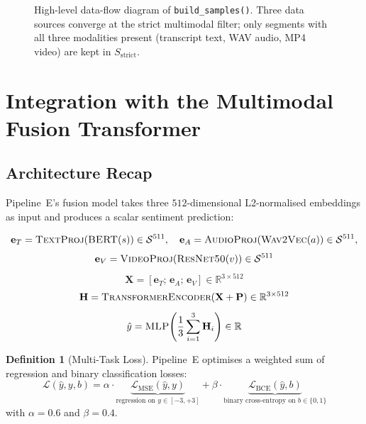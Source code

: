 \documentclass[12pt,a4paper]{article}
\theoremstyle{plain}
\theoremstyle{definition}
\newtheorem{definition}[theorem]{Definition}
\begin{document}
\begin{figure}[H]
\caption{%
  High-level data-flow diagram of \texttt{build\_samples()}.
  Three data sources converge at the strict multimodal filter; only
  segments with all three modalities present (transcript text, WAV
  audio, MP4 video) are kept in $S_\text{strict}$.
}
\label{fig:dataflow}
\end{figure}

\section{Integration with the Multimodal Fusion Transformer}
\label{sec:integration}

\subsection{Architecture Recap}

Pipeline~E's fusion model takes three $512$-dimensional L2-normalised
embeddings as input and produces a scalar sentiment prediction:

\[
  \mathbf{e}_T = \textsc{TextProj}(\textsc{BERT}(s))
  \in \mathcal{S}^{511}, \quad
  \mathbf{e}_A = \textsc{AudioProj}(\textsc{Wav2Vec}(a))
  \in \mathcal{S}^{511},
\]
\[
  \mathbf{e}_V = \textsc{VideoProj}(\textsc{ResNet50}(v))
  \in \mathcal{S}^{511}
\]
\[
  \mathbf{X} = [\mathbf{e}_T;\, \mathbf{e}_A;\, \mathbf{e}_V]
  \in \mathbb{R}^{3 \times 512}
\]
\[
  \mathbf{H} = \textsc{TransformerEncoder}(\mathbf{X} + \mathbf{P})
  \in \mathbb{R}^{3 \times 512}
\]
\[
  \hat{y} = \textsc{MLP}\!\left(\frac{1}{3}\sum_{i=1}^3
  \mathbf{H}_i\right) \in \mathbb{R}
\]

\begin{definition}[Multi-Task Loss]
\label{def:loss}
  Pipeline~E optimises a weighted sum of regression and binary
  classification losses:
  \[
    \mathcal{L}(\hat{y}, y, b) =
    \alpha \cdot \underbrace{\mathcal{L}_\text{MSE}(\hat{y}, y)}_{\text{regression on }y\in[-3,+3]}
    + \beta \cdot
    \underbrace{\mathcal{L}_\text{BCE}(\hat{y}, b)}_{\text{binary cross-entropy on }b\in\{0,1\}}
  \]
  with $\alpha = 0.6$ and $\beta = 0.4$.
\end{definition}
\end{document}
